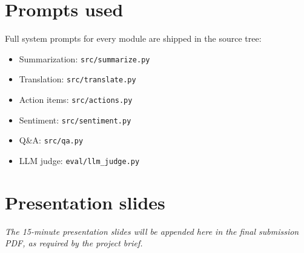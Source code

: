 \documentclass[11pt,a4paper]{article}
\begin{document}
\section{Prompts used}
\label{app:prompts}
Full system prompts for every module are shipped in the source tree:
\begin{itemize}
\item Summarization: \texttt{src/summarize.py}
\item Translation: \texttt{src/translate.py}
\item Action items: \texttt{src/actions.py}
\item Sentiment: \texttt{src/sentiment.py}
\item Q\&A: \texttt{src/qa.py}
\item LLM judge: \texttt{eval/llm\_judge.py}
\end{itemize}

\section{Presentation slides}
\label{app:slides}
\emph{The 15-minute presentation slides will be appended here in the
final submission PDF, as required by the project brief.}
\end{document}
